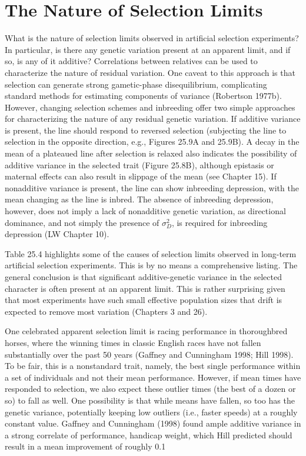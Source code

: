\documentclass{article}
\begin{document}
\section{The Nature of Selection Limits}
What is the nature of selection limits observed in artificial selection experiments? In particular, is there any genetic variation present at an apparent limit, and if so, is any of it additive? Correlations between relatives can be used to characterize the nature of residual variation. One caveat to this approach is that selection can generate strong gametic-phase disequilibrium, complicating standard methods for estimating components of variance (Robertson 1977b). However, changing selection schemes and inbreeding offer two simple approaches for characterizing the nature of any residual genetic variation. If additive variance is present, the line should respond to reversed selection (subjecting the line to selection in the opposite direction, e.g., Figures 25.9A and 25.9B). A decay in the mean of a plateaued line after selection is relaxed also indicates the possibility of additive variance in the selected trait (Figure 25.8B), although epistasis or maternal effects can also result in slippage of the mean (see Chapter 15). If nonadditive variance is present, the line can show inbreeding depression, with the mean changing as the line is inbred. The absence of inbreeding depression, however, does not imply a lack of nonadditive genetic variation, as directional dominance, and not simply the presence of  $ \sigma_{D}^{2} $, is required for inbreeding depression (LW Chapter 10).

Table 25.4 highlights some of the causes of selection limits observed in long-term artificial selection experiments. This is by no means a comprehensive listing. The general conclusion is that significant additive-genetic variance in the selected character is often present at an apparent limit. This is rather surprising given that most experiments have such small effective population sizes that drift is expected to remove most variation (Chapters 3 and 26).

One celebrated apparent selection limit is racing performance in thoroughbred horses, where the winning times in classic English races have not fallen substantially over the past 50 years (Gaffney and Cunningham 1998; Hill 1998). To be fair, this is a nonstandard trait, namely, the best single performance within a set of individuals and not their mean performance. However, if mean times have responded to selection, we also expect these outlier times (the best of a dozen or so) to fall as well. One possibility is that while means have fallen, so too has the genetic variance, potentially keeping low outliers (i.e., faster speeds) at a roughly constant value. Gaffney and Cunningham (1998) found ample additive variance in a strong correlate of performance, handicap weight, which Hill predicted should result in a mean improvement of roughly 0.1%
\end{document}
